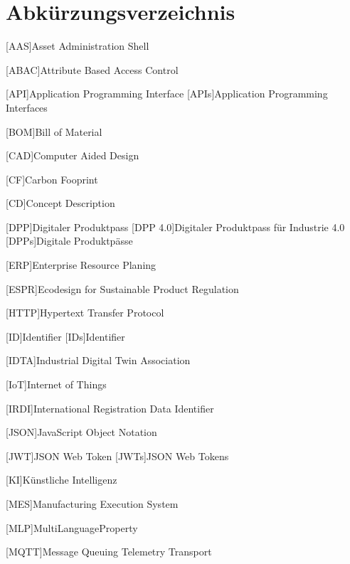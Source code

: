 \section*{Abkürzungsverzeichnis}

{

\begin{singlespacing}
\end{singlespacing}
\begin{acronym}

[AAS]{Asset Administration Shell}

[ABAC]{Attribute Based Access Control}

[API]{Application Programming Interface}
[APIs]{Application Programming Interfaces}

[BOM]{Bill of Material}

[CAD]{Computer Aided Design}

[CF]{Carbon Fooprint}

[CD]{Concept Description}

[DPP]{Digitaler Produktpass}
[DPP 4.0]{Digitaler Produktpass für Industrie 4.0}
[DPPs]{Digitale Produktpässe}

[ERP]{Enterprise Resource Planing}

[ESPR]{Ecodesign for Sustainable Product Regulation}

[HTTP]{Hypertext Transfer Protocol}

[ID]{Identifier}
[IDs]{Identifier}

[IDTA]{Industrial Digital Twin Association}

[IoT]{Internet of Things}

[IRDI]{International Registration Data Identifier}

[JSON]{JavaScript Object Notation}

[JWT]{JSON Web Token}
[JWTs]{JSON Web Tokens}

[KI]{Künstliche Intelligenz}

[MES]{Manufacturing Execution System}

[MLP]{MultiLanguageProperty}

[MQTT]{Message Queuing Telemetry Transport}


\end{acronym}}
